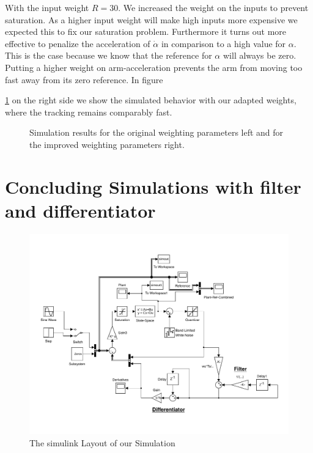 \documentclass[ twoside,openright,titlepage,numbers=noenddot,headinclude,%
                footinclude=true,cleardoublepage=empty,abstractoff, %
                BCOR=5mm,paper=a4,fontsize=11pt,%
                ngerman,american,%
                ]{scrreprt}
\begin{document}
With the input weight $R = 30$. We increased the weight on the inputs to prevent saturation. As a higher input weight will make high inputs more expensive we expected this to fix our saturation problem. Furthermore it turns out more effective to penalize the acceleration of $\dot{\alpha}$ in comparison to a high value for $\alpha$. This is the case because we know that the reference for $\alpha$ will always be zero. Putting a higher weight on arm-acceleration prevents the arm from moving too fast away from its zero reference. In figure~{\ref{fig:stepResponse} on the right side we show the simulated behavior with our adapted weights, where the tracking remains comparably fast. 


\begin{figure}


\caption{Simulation results for the original weighting parameters left and for the improved weighting parameters right.}
\label{fig:stepResponse}
\end{figure}


\section{Concluding Simulations with filter and differentiator}
\begin{figure}
\includegraphics[scale=0.5]{images/simModel.pdf}
\caption{The simulink Layout of our Simulation}
\label{fig:notallStates}
\end{figure}

}
\end{document}
